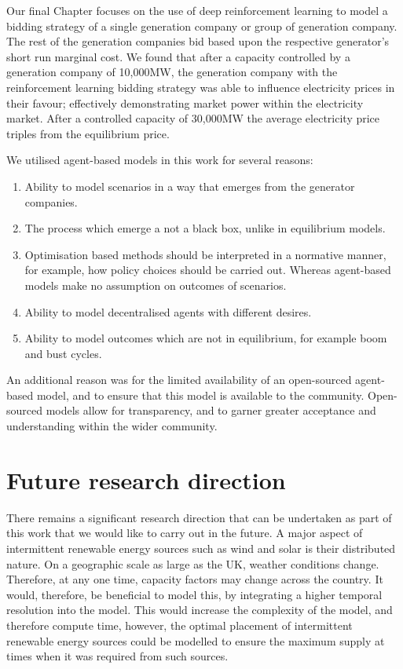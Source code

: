 Our final Chapter focuses on the use of deep reinforcement learning to model a bidding strategy of a single generation company or group of generation company. The rest of the generation companies bid based upon the respective generator's short run marginal cost. We found that after a capacity controlled by a generation company of 10,000MW, the generation company with the reinforcement learning bidding strategy was able to influence electricity prices in their favour; effectively demonstrating market power within the electricity market. After a controlled capacity of 30,000MW the average electricity price triples from the equilibrium price. 

We utilised agent-based models in this work for several reasons:
\begin{enumerate}
	\item Ability to model scenarios in a way that emerges from the generator companies.
	\item The process which emerge a not a black box, unlike in equilibrium models.
	\item Optimisation based methods should be interpreted in a normative manner, for example, how policy choices should be carried out. Whereas agent-based models make no assumption on outcomes of scenarios.
	\item Ability to model decentralised agents with different desires.
	\item Ability to model outcomes which are not in equilibrium, for example boom and bust cycles.
\end{enumerate}

An additional reason was for the limited availability of an open-sourced agent-based model, and to ensure that this model is available to the community. Open-sourced models allow for transparency, and to garner greater acceptance and understanding within the wider community. 


\section{Future research direction}

There remains a significant research direction that can be undertaken as part of this work that we would like to carry out in the future. A major aspect of intermittent renewable energy sources such as wind and solar is their distributed nature. On a geographic scale as large as the UK, weather conditions change. Therefore, at any one time, capacity factors may change across the country. It would, therefore, be beneficial to model this, by integrating a higher temporal resolution into the model. This would increase the complexity of the model, and therefore compute time, however, the optimal placement of intermittent renewable energy sources could be modelled to ensure the maximum supply at times when it was required from such sources.


